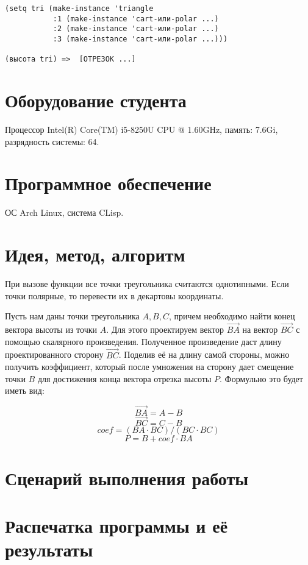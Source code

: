 \documentclass[12pt]{article}
\begin{document}
\begin{verbatim}
(setq tri (make-instance 'triangle
           :1 (make-instance 'cart-или-polar ...)
           :2 (make-instance 'cart-или-polar ...)
           :3 (make-instance 'cart-или-polar ...)))

(высота tri) =>  [ОТРЕЗОК ...]
\end{verbatim}

\section{Оборудование студента}
Процессор Intel(R) Core(TM) i5-8250U CPU @ 1.60GHz, память: 7.6Gi, разрядность 
системы: 64.

\section{Программное обеспечение}
ОС Arch Linux, система CLisp.

\section{Идея, метод, алгоритм}

    При вызове функции все точки треугольника считаются однотипными. Если точки
полярные, то перевести их в декартовы координаты.

Пусть нам даны точки треугольника $A, B, C$, причем необходимо найти конец вектора
высоты из точки $A$. Для этого проектируем вектор $\vec{BA}$ на вектор $\vec{BC}$
с помощью скалярного произведения. Полученное произведение даст длину проектированного
сторону $\vec{BC}$. Поделив её на длину самой стороны, можно получить коэффициент,
который после умножения на сторону дает смещение точки $B$ для достижения конца
вектора отрезка высоты $P$. Формульно это будет иметь вид:

$$
    \vec{BA} = A - B
$$
$$
    \vec{BC} = C - B
$$
$$
    coef = (BA \cdot BC) / (BC \cdot BC)
$$
$$
    P = B + coef \cdot BA
$$

\section{Сценарий выполнения работы}

\section{Распечатка программы и её результаты}
\end{document}
